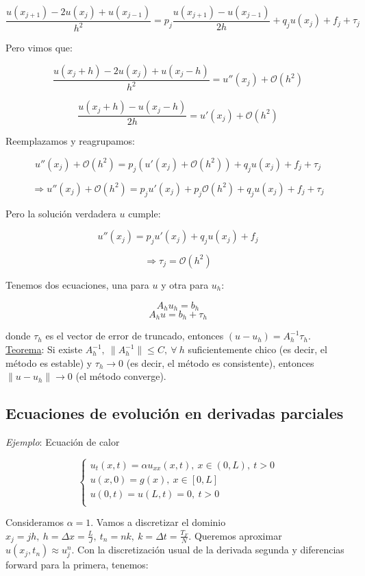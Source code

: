 $$\frac{u(x_{j + 1}) - 2u(x_{j}) + u(x_{j - 1})}{h^{2}} = p_{j}\frac{u(x_{j + 1}) - u(x_{j - 1})}{2h} + q_{j}u(x_{j}) + f_{j} + \tau_{j}$$

Pero vimos que:

$$\frac{u(x_{j} + h) - 2u(x_{j}) + u(x_{j} - h)}{h^{2}} = u''(x_{j}) + \mathcal{O}(h^{2})$$

$$\frac{u(x_{j} + h) - u(x_{j} - h)}{2h} = u'(x_{j}) + \mathcal{O}(h^{2})$$

Reemplazamos y reagrupamos:

$$u''(x_{j}) + \mathcal{O}(h^{2}) = p_{j}(u'(x_{j}) + \mathcal{O}(h^{2})) + q_{j}u(x_{j}) + f_{j} + \tau_{j}$$

$$\Rightarrow u''(x_{j}) + \mathcal{O}(h^{2}) = p_{j}u'(x_{j}) + p_{j}\mathcal{O}(h^{2}) + q_{j}u(x_{j}) + f_{j} + \tau_{j}$$

Pero la soluci\'on verdadera $u$ cumple:

$$u''(x_{j}) = p_{j}u'(x_{j}) + q_{j}u(x_{j}) + f_{j}$$

$$\Rightarrow \tau_{j} = \mathcal{O}(h^{2})$$

Tenemos dos ecuaciones, una para $u$ y otra para $u_{h}$:

$$A_{h}u_{h} = b_{h}$$
$$A_{h}u = b_{h} + \tau_{h}$$

donde $\tau_{h}$ es el vector de error de truncado, entonces $(u - u_{h}) = A_{h}^{-1}\tau_{h}$.\\

\underline{Teorema}: Si existe $A_{h}^{-1},\ \|A_{h}^{-1}\| \leq C,\ \forall \ h$ suficientemente chico (es decir, el m\'etodo es estable) y $\tau_{h} \rightarrow 0$ (es decir, el m\'etodo es consistente), entonces $\|u - u_{h}\| \rightarrow 0$ (el m\'etodo converge).

\subsection{Ecuaciones de evoluci\'on en derivadas parciales}

\textit{Ejemplo}: Ecuaci\'on de calor

$$ 
	\begin{cases}
        u_{t}(x, t) = \alpha u_{xx}(x, t),\ x \in (0, L),\ t > 0\\
        u(x, 0) = g(x),\ x \in [0, L]\\
        u(0, t) = u(L, t) = 0,\ t > 0\\
    \end{cases}
$$

Consideramos $\alpha = 1$. Vamos a discretizar el dominio $x_{j} = jh,\ h = \Delta x = \frac{L}{J},\ t_{n} = nk,\ k = \Delta t = \frac{T_{F}}{N}$. Queremos aproximar $u(x_{j}, t_{n}) \approx u_{j}^{n}$. Con la discretizaci\'on usual de la derivada segunda y diferencias forward para la primera, tenemos:

